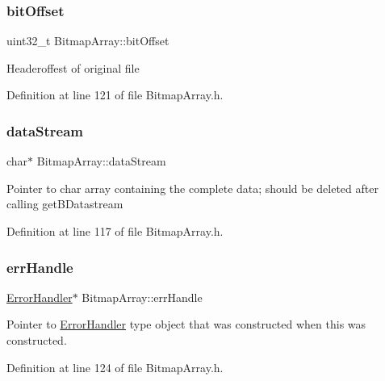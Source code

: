 \subsubsection{\texorpdfstring{bitOffset}{bitOffset}}
{\footnotesize\ttfamily uint32\+\_\+t Bitmap\+Array\+::bit\+Offset\hspace{0.3cm}{\ttfamily [private]}}

Headeroffest of original file 

Definition at line 121 of file Bitmap\+Array.\+h.

\mbox{\label{classBitmapArray_adce9e9343b6f351ddfaa32c234d18a0a}} 
\subsubsection{\texorpdfstring{dataStream}{dataStream}}
{\footnotesize\ttfamily char$\ast$ Bitmap\+Array\+::data\+Stream\hspace{0.3cm}{\ttfamily [private]}}

Pointer to char array containing the complete data; should be deleted after calling get\+B\+Datastream 

Definition at line 117 of file Bitmap\+Array.\+h.

\mbox{\label{classBitmapArray_a8d95e8cb2bf8c0f618465a389e8ffe4d}} 
\subsubsection{\texorpdfstring{errHandle}{errHandle}}
{\footnotesize\ttfamily \mbox{\hyperlink{classErrorHandler}{Error\+Handler}}$\ast$ Bitmap\+Array\+::err\+Handle\hspace{0.3cm}{\ttfamily [private]}}

Pointer to \mbox{\hyperlink{classErrorHandler}{Error\+Handler}} type object that was constructed when this was constructed. 

Definition at line 124 of file Bitmap\+Array.\+h.

\mbox{\label{classBitmapArray_adfd3e5a1eed42e37b22a4f2f2560ad67}} 
